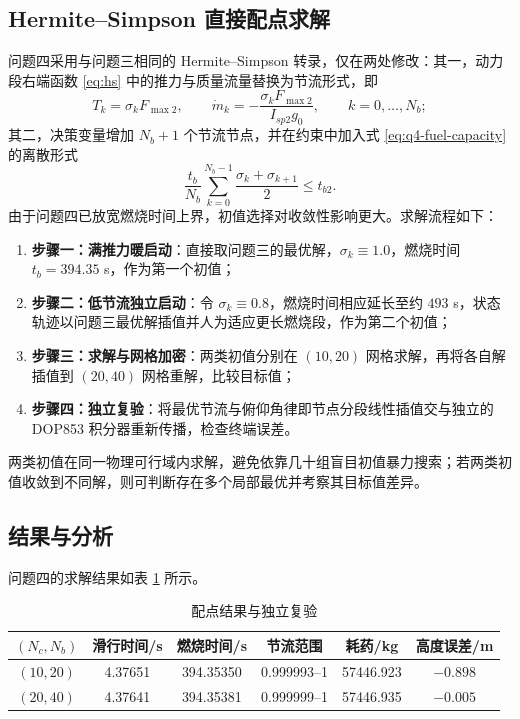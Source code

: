 \documentclass[withoutpreface,bwprint]{cumcmthesis}
\begin{document}
\subsection{Hermite--Simpson 直接配点求解}
问题四采用与问题三相同的 Hermite--Simpson 转录，仅在两处修改：其一，动力段右端函数 \eqref{eq:hs} 中的推力与质量流量替换为节流形式，即
\begin{equation}
T_k=\sigma_kF_{\max2},\qquad
\dot m_k=-\frac{\sigma_kF_{\max2}}{I_{sp2}g_0},\qquad k=0,\dots,N_b;
\label{eq:q4-dyn-node}
\end{equation}
其二，决策变量增加 $N_b+1$ 个节流节点，并在约束中加入式 \eqref{eq:q4-fuel-capacity} 的离散形式
\begin{equation}
\frac{t_b}{N_b}\sum_{k=0}^{N_b-1}\frac{\sigma_k+\sigma_{k+1}}{2}\le t_{b2}.
\label{eq:q4-capacity-discrete}
\end{equation}
由于问题四已放宽燃烧时间上界，初值选择对收敛性影响更大。求解流程如下：
\begin{enumerate}
  \item \textbf{步骤一：满推力暖启动}：直接取问题三的最优解，$\sigma_k\equiv1.0$，燃烧时间 $t_b=394.35$ s，作为第一个初值；
  \item \textbf{步骤二：低节流独立启动}：令 $\sigma_k\equiv0.8$，燃烧时间相应延长至约 $493$ s，状态轨迹以问题三最优解插值并人为适应更长燃烧段，作为第二个初值；
  \item \textbf{步骤三：求解与网格加密}：两类初值分别在 $(10,20)$ 网格求解，再将各自解插值到 $(20,40)$ 网格重解，比较目标值；
  \item \textbf{步骤四：独立复验}：将最优节流与俯仰角律即节点分段线性插值交与独立的 DOP853 积分器重新传播，检查终端误差。
\end{enumerate}
两类初值在同一物理可行域内求解，避免依靠几十组盲目初值暴力搜索；若两类初值收敛到不同解，则可判断存在多个局部最优并考察其目标值差异。

\subsection{结果与分析}
问题四的求解结果如表 \ref{tab:q4res} 所示。

\begin{table}[!htbp]
\caption{配点结果与独立复验}
\label{tab:q4res}
\centering
\begin{tabular}{c|c|c|c|c|c}
\toprule[1.5pt]
$(N_c,N_b)$ & 滑行时间/s & 燃烧时间/s & 节流范围 & 耗药/kg & 高度误差/m \\
\midrule[1pt]
$(10,20)$ & 4.37651 & 394.35350 & 0.999993--1 & 57446.923 & $-0.898$ \\
$(20,40)$ & 4.37641 & 394.35381 & 0.999999--1 & 57446.935 & $-0.005$ \\
\bottomrule[1.5pt]
\end{tabular}
\end{table}
\end{document}
